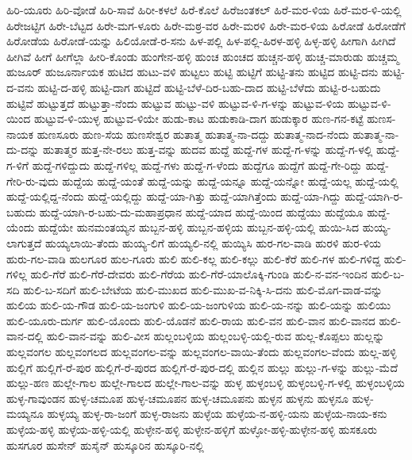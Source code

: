 ಹಿರಿ-ಯೂರು
ಹಿರಿ-ವೋಡೆ
ಹಿರಿ-ಸಾವೆ
ಹಿರೀ-ಕಳಲೆ
ಹಿರೆ-ಕೊಲೆ
ಹಿರೆಜಂತಕಲ್
ಹಿರೆ-ಮರ-ಳಿಯ
ಹಿರೆ-ಮರ-ಳಿ-ಯಲ್ಲಿ
ಹಿರೇಜಟ್ಟಿಗ
ಹಿರೇ-ಬೆಟ್ಟದ
ಹಿರೇ-ಮಗ-ಳೂರು
ಹಿರೇ-ಮಠ್ರ-ವರ
ಹಿರೇ-ಮರಳಿ
ಹಿರೇ-ಮರ-ಳಿಯ
ಹಿರೋಡೆ
ಹಿರೋಡೆಗೆ
ಹಿರೋಡೆಯ
ಹಿರೋಡೆ-ಯನ್ನು
ಹಿಲಿಯೋಡೆ-ರ-ಸನು
ಹಿಳ-ಪಲ್ಲಿ
ಹಿಳ-ಪಲ್ಲಿ-ಹಿರಳ-ಹಳ್ಳಿ
ಹಿಳ್ಳ-ಹಳ್ಳಿ
ಹೀಗಾಗಿ
ಹೀಗಿದೆ
ಹೀಗಿವೆ
ಹೀಗೆ
ಹೀಗೆಲ್ಲಾ
ಹೀರಿ-ಕೊಂಡು
ಹುಂಗೇನ-ಹಳ್ಳಿ
ಹುಂಚ
ಹುಂಚದ
ಹುಚ್ಚನ-ಹಳ್ಳಿ
ಹುಚ್ಚ-ಮಾರುಡು
ಹುಚ್ಚಮ್ಮ
ಹುಜೂರ್
ಹುಜೂರ್ನಾಯಕ
ಹುಟಿದ
ಹುಟು-ವಳಿ
ಹುಟ್ಟಲು
ಹುಟ್ಟಿ
ಹುಟ್ಟಿಗೆ
ಹುಟ್ಟಿ-ತನು
ಹುಟ್ಟಿದ
ಹುಟ್ಟಿ-ದನು
ಹುಟ್ಟಿ-ದ-ವನು
ಹುಟ್ಟಿ-ದ-ಹಳ್ಳಿ
ಹುಟ್ಟಿ-ದಾಗ
ಹುಟ್ಟಿದೆ
ಹುಟ್ಟಿ-ಬೆಳೆ-ದಿರ-ಬಹು-ದಾದ
ಹುಟ್ಟಿ-ಬೆಳೆದು
ಹುಟ್ಟಿ-ರ-ಬಹುದು
ಹುಟ್ಟಿವೆ
ಹುಟ್ಟುತ್ತದೆ
ಹುಟ್ಟುತ್ತಾ-ನೆಂದು
ಹುಟ್ಟುವ
ಹುಟ್ಟು-ವಳಿ
ಹುಟ್ಟುವ-ಳಿ-ಗ-ಳನ್ನು
ಹುಟ್ಟುವ-ಳಿಯ
ಹುಟ್ಟುವ-ಳಿ-ಯಿಂದ
ಹುಟ್ಟುವ-ಳಿ-ಯುಳ್ಳ
ಹುಟ್ಟುವ-ಳಿಯೇ
ಹುಡು-ಕಾಟ
ಹುಡುಕಾಡಿ-ದಾಗ
ಹುಡುಕ್ಕಾರ
ಹುಣ-ಗನ-ಕಟ್ಟೆ
ಹುಣಸ-ನಾಯಕ
ಹುಣಸೂರು
ಹುಣ-ಸೆಯ
ಹುಣಸೇಶ್ವರ
ಹುತಾತ್ಮ
ಹುತಾತ್ಮ-ನಾ-ದದ್ದು
ಹುತಾತ್ಮ-ನಾದ-ನೆಂದು
ಹುತಾತ್ಮ-ನಾ-ದು-ದನ್ನು
ಹುತಾತ್ಮರ
ಹುತ್ತ-ನೇ-ರಲು
ಹುತ್ತ-ವನ್ನು
ಹುದವ
ಹುದ್ದೆ
ಹುದ್ದೆ-ಗಳ
ಹುದ್ದೆ-ಗ-ಳನ್ನು
ಹುದ್ದೆ-ಗ-ಳಲ್ಲಿ
ಹುದ್ದೆ-ಗ-ಳಿಗೆ
ಹುದ್ದೆ-ಗಳಿದ್ದುದು
ಹುದ್ದೆ-ಗಳಿಲ್ಲ
ಹುದ್ದೆ-ಗಳು
ಹುದ್ದೆ-ಗ-ಳೆಂದು
ಹುದ್ದೆಗೂ
ಹುದ್ದೆಗೆ
ಹುದ್ದೆ-ಗೇ-ರಿದ್ದು
ಹುದ್ದೆ-ಗೇರಿ-ರು-ವುದು
ಹುದ್ದೆಯ
ಹುದ್ದೆ-ಯಂತೆ
ಹುದ್ದೆ-ಯನ್ನು
ಹುದ್ದೆ-ಯನ್ನೂ
ಹುದ್ದೆ-ಯನ್ನೋ
ಹುದ್ದೆ-ಯಲ್ಲ
ಹುದ್ದೆ-ಯಲ್ಲಿ
ಹುದ್ದೆ-ಯಲ್ಲಿದ್ದ-ನೆಂದು
ಹುದ್ದೆ-ಯಲ್ಲಿದ್ದು
ಹುದ್ದೆ-ಯಾ-ಗಿತ್ತು
ಹುದ್ದೆ-ಯಾಗಿತ್ತೆಂದು
ಹುದ್ದೆ-ಯಾ-ಗಿದ್ದು
ಹುದ್ದೆ-ಯಾಗಿ-ರ-ಬಹುದು
ಹುದ್ದೆ-ಯಾಗಿ-ರ-ಬಹು-ದು-ಮಹಾಪ್ರಧಾನ
ಹುದ್ದೆ-ಯಾದ
ಹುದ್ದೆ-ಯಿಂದ
ಹುದ್ದೆಯು
ಹುದ್ದೆಯೂ
ಹುದ್ದೆ-ಯೆಂದು
ಹುದ್ದೆಯೇ
ಹುನಮಂತಯ್ಯನ
ಹುಬ್ಬನ-ಹಳ್ಳಿ
ಹುಬ್ಬನ-ಹಳ್ಳಿಯ
ಹುಬ್ಬನ-ಹಳ್ಳಿ-ಯಲ್ಲಿ
ಹುಯಿ-ಸಿದ
ಹುಯ್ಯ-ಲಾಗುತ್ತದೆ
ಹುಯ್ಯಲಾಯಿ-ತೆಂದು
ಹುಯ್ಯ-ಲಿಗೆ
ಹುಯ್ಯಲಿ-ನಲ್ಲಿ
ಹುಯ್ಯಿಸಿ
ಹುರ-ಗಲ-ವಾಡಿ
ಹುರಳಿ
ಹುರ-ಳಿಯ
ಹುರು-ಗಲ-ವಾಡಿ
ಹುಲಗೂರ
ಹುಲ-ಗೂರು
ಹುಲಿ
ಹುಲಿ-ಕಲ್ಲ
ಹುಲಿ-ಕಲ್ಲು
ಹುಲಿ-ಕೆರೆ
ಹುಲಿ-ಗಳ
ಹುಲಿ-ಗಳಿದ್ದ
ಹುಲಿ-ಗಳಿಲ್ಲ
ಹುಲಿ-ಗೆರೆ
ಹುಲಿ-ಗೆರೆ-ದೇವರು
ಹುಲಿ-ಗೆರೆಯ
ಹುಲಿ-ಗೆರೆ-ಯಾಲೊಕ್ಕಿ-ಗುಂಡಿ
ಹುಲಿ-ನ-ವನ-ಇಂದಿನ
ಹುಲಿ-ಬ-ಸದಿ
ಹುಲಿ-ಬ-ಸದಿಗೆ
ಹುಲಿ-ಬೇಟೆಯ
ಹುಲಿ-ಮುಖದ
ಹುಲಿ-ಮುಖ-ವ-ನಿಕ್ಕಿ-ಸಿ-ದನು
ಹುಲಿ-ಮೊಗ-ವಾಡ-ವನ್ನು
ಹುಲಿಯ
ಹುಲಿ-ಯ-ಗೌಡ
ಹುಲಿ-ಯ-ಜಂಗುಳಿ
ಹುಲಿ-ಯ-ಜಂಗುಳಿಯ
ಹುಲಿ-ಯ-ನನ್ನು
ಹುಲಿ-ಯನ್ನು
ಹುಲಿಯು
ಹುಲಿ-ಯೂರು-ದುರ್ಗ
ಹುಲಿ-ಯೊಂದು
ಹುಲಿ-ಯೊಡನೆ
ಹುಲಿ-ರಾಯ
ಹುಲಿ-ವನ
ಹುಲಿ-ವಾನ
ಹುಲಿ-ವಾನದ
ಹುಲಿ-ವಾನ-ದಲ್ಲಿ
ಹುಲಿ-ವಾನ-ವನ್ನು
ಹುಲಿ-ವೀಸ
ಹುಲ್ಲಂಬಳ್ಳಿಯ
ಹುಲ್ಲಂಬಳ್ಳಿ-ಯಲ್ಲಿ-ರುವ
ಹುಲ್ಲ-ಕೊಪ್ಪಲು
ಹುಲ್ಲನ್ನು
ಹುಲ್ಲವಂಗಲ
ಹುಲ್ಲವಂಗಲದ
ಹುಲ್ಲವಂಗಲ-ವನ್ನು
ಹುಲ್ಲವಂಗಲ-ವಾಯಿ-ತೆಂದು
ಹುಲ್ಲವಂಗಲ-ವೆಂದು
ಹುಲ್ಲ-ಹಳ್ಳಿ
ಹುಲ್ಲಿಗೆ
ಹುಲ್ಲಿಗೆ-ರೆ-ಪುರ
ಹುಲ್ಲಿಗೆ-ರೆ-ಪುರದ
ಹುಲ್ಲಿಗೆ-ರೆ-ಪುರ-ದಲ್ಲಿ
ಹುಲ್ಲಿನ
ಹುಲ್ಲು
ಹುಲ್ಲು-ಗ-ಳನ್ನು
ಹುಲ್ಲು-ಮೆದೆ
ಹುಲ್ಲು-ಹಣ
ಹುಲ್ಲೇ-ಗಾಲ
ಹುಲ್ಲೇ-ಗಾಲದ
ಹುಲ್ಲೇ-ಗಾಲ-ವನ್ನು
ಹುಳ್ಳ
ಹುಳ್ಳಂಬಳ್ಳಿ
ಹುಳ್ಳಂಬಳ್ಳಿ-ಗ-ಳಲ್ಲಿ
ಹುಳ್ಳಂಬಳ್ಳಿಯ
ಹುಳ್ಳ-ಗಾವುಂಡನ
ಹುಳ್ಳ-ಚಮೂಪ
ಹುಳ್ಳ-ಚಮೂಪನ
ಹುಳ್ಳ-ಚಮೂಪನು
ಹುಳ್ಳನ
ಹುಳ್ಳನು
ಹುಳ್ಳನೂ
ಹುಳ್ಳ-ಮಯ್ಯನೂ
ಹುಳ್ಳಯ್ಯ
ಹುಳ್ಳ-ರಾ-ಜಂಗೆ
ಹುಳ್ಳ-ರಾಜನು
ಹುಳ್ಳೆಯ
ಹುಳ್ಳೆಯ-ನ-ಹಳ್ಳಿ-ಯನು
ಹುಳ್ಳೆಯ-ನಾಯ-ಕನು
ಹುಳ್ಳೆಯ-ಹಳ್ಳಿ
ಹುಳ್ಳೆಯ-ಹಳ್ಳಿ-ಯಲ್ಲಿ
ಹುಳ್ಳೇನ-ಹಳ್ಳಿ
ಹುಳ್ಳೇನ-ಹಳ್ಳಿಗೆ
ಹುಳ್ಳೋ-ಹಳ್ಳಿ-ಹುಳ್ಳೇನ-ಹಳ್ಳಿ
ಹುಸಕೂರು
ಹುಸಗೂರ
ಹುಸೇನ್
ಹುಸೈನ್
ಹುಸ್ಕೂರಿನ
ಹುಸ್ಕೂರಿ-ನಲ್ಲಿ
